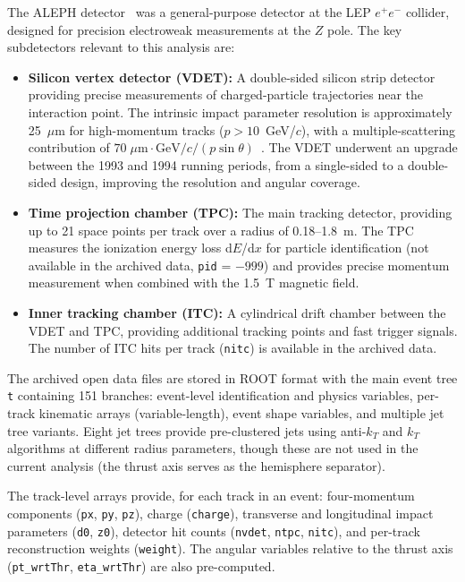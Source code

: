 \documentclass[11pt,a4paper]{article}
\begin{document}
The ALEPH detector~\cite{ALEPH:VDET} was a general-purpose detector at the LEP
$e^+e^-$ collider, designed for precision electroweak measurements at the $Z$ pole.
The key subdetectors relevant to this analysis are:

\begin{itemize}
\item \textbf{Silicon vertex detector (VDET):} A double-sided silicon strip detector
providing precise measurements of charged-particle trajectories near the interaction
point. The intrinsic impact parameter resolution is approximately 25~$\mu$m for
high-momentum tracks ($p > 10$~GeV/$c$), with a multiple-scattering contribution
of $70\;\mu\mathrm{m}\cdot\mathrm{GeV}/c / (p \sin\theta)$~\cite{ALEPH:VDET}.
The VDET underwent an upgrade between the 1993 and 1994 running periods,
from a single-sided to a double-sided design, improving the resolution and
angular coverage.

\item \textbf{Time projection chamber (TPC):} The main tracking detector, providing
up to 21 space points per track over a radius of 0.18--1.8~m. The TPC measures
the ionization energy loss d$E$/d$x$ for particle identification (not available
in the archived data, \texttt{pid} = $-999$) and provides precise momentum
measurement when combined with the 1.5~T magnetic field.

\item \textbf{Inner tracking chamber (ITC):} A cylindrical drift chamber between the
VDET and TPC, providing additional tracking points and fast trigger signals. The
number of ITC hits per track (\texttt{nitc}) is available in the archived data.
\end{itemize}

The archived open data files are stored in ROOT format with the main event tree
\texttt{t} containing 151 branches: event-level identification and physics variables,
per-track kinematic arrays (variable-length), event shape variables, and multiple jet
tree variants. Eight jet trees provide pre-clustered jets using anti-$k_T$ and
$k_T$ algorithms at different radius parameters, though these are not used in the
current analysis (the thrust axis serves as the hemisphere separator).

The track-level arrays provide, for each track in an event: four-momentum components
(\texttt{px}, \texttt{py}, \texttt{pz}), charge (\texttt{charge}), transverse and
longitudinal impact parameters (\texttt{d0}, \texttt{z0}), detector hit counts
(\texttt{nvdet}, \texttt{ntpc}, \texttt{nitc}), and per-track reconstruction weights
(\texttt{weight}). The angular variables relative to the thrust axis (\texttt{pt\_wrtThr},
\texttt{eta\_wrtThr}) are also pre-computed.
\end{document}

